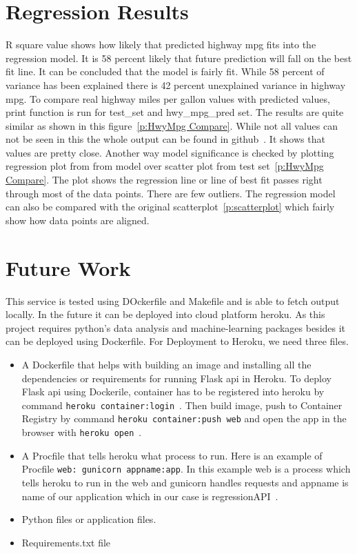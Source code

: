   
\section{Regression Results}
 R square value shows how likely that predicted highway mpg fits into the
 regression model. It is 58 percent likely that future prediction will fall
 on the best fit line. It can be concluded that the model is fairly fit. While 
 58 percent of variance has been explained there is 42 percent unexplained
 variance in highway mpg. To compare real highway miles per gallon values with 
 predicted values, print function is
 run for test\_set and hwy\_mpg\_pred set. The results are quite similar as
 shown in this figure~\ref{p:HwyMpg Compare}. While not all values can not be seen  
 in this the whole output can be found in github~\cite{hid-sp18-415-analysis}.
 It shows that values are pretty close.
 Another way model significance is checked by plotting regression plot from
 from model over scatter plot from test set~\ref{p:HwyMpg Compare}. The plot shows 
 the regression line or line of best fit passes right through most of the data
 points. There are few outliers. The regression model can also be compared with 
 the original scatterplot~\ref{p:scatterplot} which fairly show how data points
 are aligned.  
 
\section{Future Work} 

This service is tested using DOckerfile and Makefile and is able to fetch
output locally. In the future it can be deployed into cloud platform heroku.
As this project requires python's data analysis and machine-learning packages 
besides it can be deployed using Dockerfile. For Deployment to Heroku, we need 
three files.
\begin{itemize}
 \item A Dockerfile that helps with building an image and installing all the 
 dependencies or requirements for running Flask api in Heroku. To deploy Flask 
 api using Dockerile, container has to be registered into heroku by command
 \verb|heroku container:login|~\cite{hid-sp18-415-heroku}. Then build image,
 push to Container Registry by command 
 \verb|heroku container:push web| and open the app in the browser with
 \verb|heroku open|~\cite{hid-sp18-415-heroku}.
 
 \item A Procfile that tells heroku what process to run. Here is an example of 
 Procfile \verb|web: gunicorn appname:app|. In this example web is a process
 which tells heroku to run in the web and gunicorn handles requests and appname 
 is name of our application which in our case is 
 regressionAPI~\cite{hid-sp-18-415-regresssionapi}.
 \item Python files or application files.
 \item Requirements.txt file
 
 \end{itemize}

